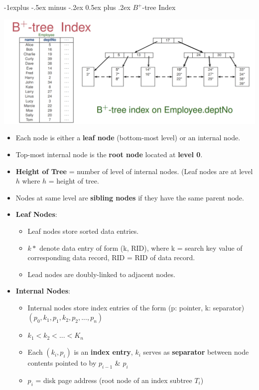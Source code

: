 \documentclass[10pt, landscape]{article}
\makeatletter
\renewcommand{\subsection}{\@startsection{subsection}{2}{0mm}%
                                {-1explus -.5ex minus -.2ex}%
                                {0.5ex plus .2ex}%
                                {\normalfont\normalsize\bfseries}}
\makeatother
\begin{document}
\begin{multicols*}{3}
\subsection{$B^+$-tree Index}
\centerline{\includegraphics[width = 1\linewidth]{B+TreeIndex}}
\begin{itemize}
\item Each node is either a \textbf{leaf node} (bottom-most level) or an internal node. 
\item Top-most internal node is the \textbf{root node} located at \textbf{level 0}.
\item \textbf{Height of Tree} = number of level of internal nodes. (Leaf nodes are at level $h$ where $h$ = height of tree.
\item Nodes at same level are \textbf{sibling nodes} if they have the same parent node.
\item \textbf{Leaf Nodes}:
	\begin{itemize}
	\item Leaf nodes store sorted data entries.
	\item $k*$ denote data entry of form (k, RID), where k = search key value of corresponding data record, RID = RID of data record.
	\item Lead nodes are doubly-linked to adjacent nodes.
	\end{itemize}
\item \textbf{Internal Nodes}:
	\begin{itemize}
	\item Internal nodes store index entries of the form (p: pointer, k: separator)\\
	 $(p_0, k_1, p_1, k_2, p_2, ..., p_n)$
	\item $k_1 < k_2 < ... < K_n$
	\item Each $(k_i, p_i)$ is an \textbf{index entry}, $k_i$ serves as \textbf{separator} between node contents pointed to by $p_{i-1}$ \& $p_i$
	\item $p_i$ = disk page address (root node of an index subtree $T_i$)
	\end{itemize}
\end{itemize}


\end{multicols*}
\end{document}
